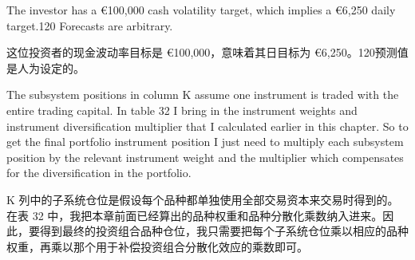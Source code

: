 \begin{englishblock} The investor has a €100,000 cash volatility target, which implies a €6,250 daily target.120 Forecasts are arbitrary. \end{englishblock}

\begin{chineseblock}这位投资者的现金波动率目标是 €100,000，意味着其日目标为 €6,250。120预测值是人为设定的。\end{chineseblock}

\bipairgap

\begin{englishblock} The subsystem positions in column K assume one instrument is traded with the entire trading capital. In table 32 I bring in the instrument weights and instrument diversification multiplier that I calculated earlier in this chapter. So to get the final portfolio instrument position I just need to multiply each subsystem position by the relevant instrument weight and the multiplier which compensates for the diversification in the portfolio. \end{englishblock}

\begin{chineseblock} K 列中的子系统仓位是假设每个品种都单独使用全部交易资本来交易时得到的。在表 32 中，我把本章前面已经算出的品种权重和品种分散化乘数纳入进来。因此，要得到最终的投资组合品种仓位，我只需要把每个子系统仓位乘以相应的品种权重，再乘以那个用于补偿投资组合分散化效应的乘数即可。\end{chineseblock}

